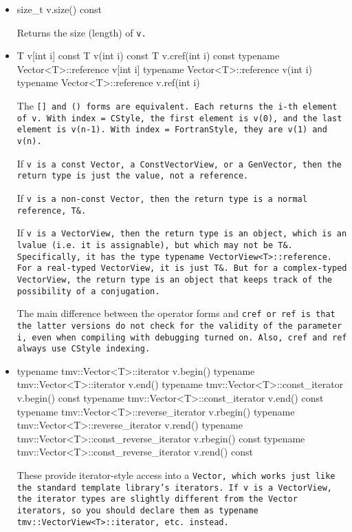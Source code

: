 \begin{itemize}
\item
\begin{tmvcode}
size_t v.size() const
\end{tmvcode}
Returns the size (length) of \tt{v}.

\item
\begin{tmvcode}
T v[int i] const
T v(int i) const
T v.cref(int i) const
typename Vector<T>::reference v[int i]
typename Vector<T>::reference v(int i)
typename Vector<T>::reference v.ref(int i)
\end{tmvcode}
The \tt{[]} and \tt{()} forms are equivalent.  Each returns the \tt{i}-th element of \tt{v}.  
With \tt{index = CStyle}, the first 
element is \tt{v(0)}, and the last element is \tt{v(n-1)}.
With \tt{index = FortranStyle}, they are \tt{v(1)} and \tt{v(n)}.

If \tt{v} is a 
\tt{const Vector}, a \tt{ConstVectorView}, or a \tt{GenVector}, 
then the return type is just the value, not a reference.

If \tt{v} is a 
non-\tt{const Vector}, then the return type is a normal reference, \tt{T\&}.

If \tt{v} is a \tt{VectorView}, then the return type is an object, which is
an lvalue (i.e. it is assignable), but which may not be \tt{T\&}.
Specifically, it has the type \tt{typename VectorView<T>::reference}.
For a real-typed \tt{VectorView}, it is just \tt{T\&}.  But for a
complex-typed \tt{VectorView}, the return type is an object that keeps track of the
possibility of a conjugation.

The main difference between the operator forms and \tt{cref} or \tt{ref} is that the latter versions do not
check for the validity of the parameter \tt{i}, even when compiling with debugging turned on.
Also, \tt{cref} and \tt{ref} always use \tt{CStyle} indexing.


\item
\begin{tmvcode}
typename tmv::Vector<T>::iterator v.begin()
typename tmv::Vector<T>::iterator v.end()
typename tmv::Vector<T>::const_iterator v.begin() const
typename tmv::Vector<T>::const_iterator v.end() const
typename tmv::Vector<T>::reverse_iterator v.rbegin()
typename tmv::Vector<T>::reverse_iterator v.rend()
typename tmv::Vector<T>::const_reverse_iterator v.rbegin() const
typename tmv::Vector<T>::const_reverse_iterator v.rend() const
\end{tmvcode}
These provide iterator-style access into a \tt{Vector}, which works just like
the standard template library's iterators.  If \tt{v} is a \tt{VectorView},
the iterator types are slightly different from the \tt{Vector} iterators, 
so you should declare them as \tt{typename tmv::VectorView<T>::iterator},
etc. instead.

\end{itemize}

